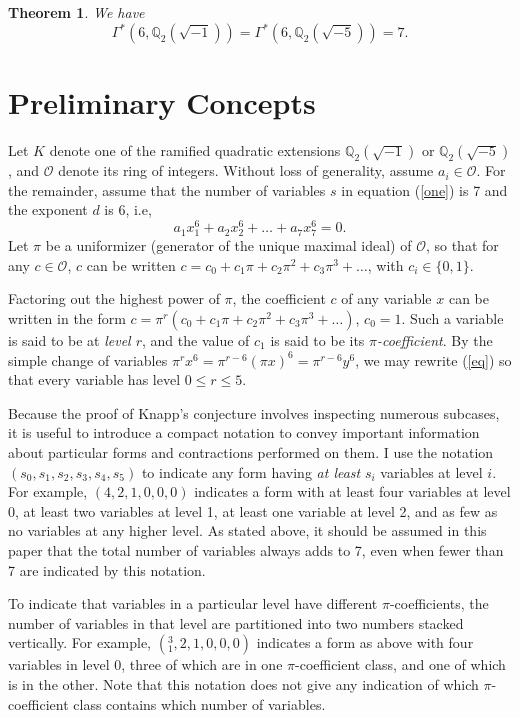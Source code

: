\documentclass{article}
\newtheorem{theorem}{Theorem}
\begin{document}
\begin{theorem}
We have $$\Gamma^*(6, \mathbb{Q}_2(\sqrt{-1})) = \Gamma^*(6, \mathbb{Q}_2(\sqrt{-5})) = 7. $$
\end{theorem}

\section{Preliminary Concepts}

Let $K$ denote one of the ramified quadratic extensions $\mathbb{Q}_2(\sqrt{-1})$ or $\mathbb{Q}_2(\sqrt{-5})$, and $\mathcal{O}$ denote its ring of integers.  Without loss of generality, assume $a_i \in \mathcal{O}$.  For the remainder, assume that the number of variables $s$ in equation (\ref{one}) is 7 and the exponent $d$ is 6, i.e,
\begin{equation}
\label{eq}
a_1x_1^6 + a_2x_2^6 + \ldots + a_7x_7^6 = 0.
\end{equation}
Let $\pi$ be a uniformizer (generator of the unique maximal ideal) of $\mathcal{O}$, so that for any $c \in \mathcal{O}$, $c$ can be written $c = c_0 + c_1\pi + c_2\pi^2 + c_3\pi^3 + \ldots$, with $c_i \in \{0,1\}$.

Factoring out the highest power of $\pi$, the coefficient $c$ of any variable $x$ can be written in the form $c = \pi^r(c_0 + c_1\pi + c_2\pi^2 + c_3\pi^3 + \ldots)$, $c_0 = 1$.  Such a variable is said to be at \textit{level $r$}, and the value of $c_1$ is said to be its \textit{$\pi$-coefficient}.  By the simple change of variables $\pi^r x^6 = \pi^{r-6}(\pi x)^6 = \pi^{r-6}y^6$, we may rewrite (\ref{eq}) so that every variable has level $0 \le r \le 5$.

Because the proof of Knapp's conjecture involves inspecting numerous subcases, it is useful to introduce a compact notation to convey important information about particular forms and contractions performed on them.  I use the notation $(s_0, s_1, s_2, s_3, s_4, s_5)$ to indicate any form having \textit{at least} $s_i$ variables at level $i$.  For example, $(4, 2, 1, 0, 0, 0)$ indicates a form with at least four variables at level 0, at least two variables at level 1, at least one variable at level 2, and as few as no variables at any higher level.  As stated above, it should be assumed in this paper that the total number of variables always adds to 7, even when fewer than 7 are indicated by this notation.

To indicate that variables in a particular level have different $\pi$-coefficients, the number of variables in that level are partitioned into two numbers stacked vertically.  For example, $(^3_1, 2, 1, 0, 0, 0)$ indicates a form as above with four variables in level 0, three of which are in one $\pi$-coefficient class, and one of which is in the other.  Note that this notation does not give any indication of which $\pi$-coefficient class contains which number of variables.
\end{document}
